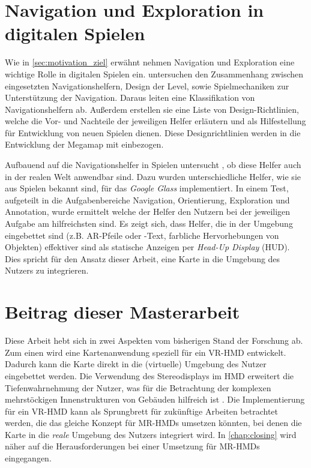 \section{Navigation und Exploration in digitalen Spielen}
Wie in \autoref{sec:motivation_ziel} erwähnt nehmen Navigation und Exploration eine wichtige Rolle in digitalen Spielen ein.
\textcites{Moura2014}{Moura2015} untersuchen den Zusammenhang zwischen eingesetzten Navigationshelfern, Design der Level, sowie Spielmechaniken zur Unterstützung der Navigation.
Daraus leiten \textcite{Moura2015} eine Klassifikation von Navigationshelfern ab.
Außerdem erstellen sie eine Liste von Design-Richtlinien, welche die Vor- und Nachteile der jeweiligen Helfer erläutern und als Hilfestellung für Entwicklung von neuen Spielen dienen.
Diese Designrichtlinien werden in die Entwicklung der Megamap mit einbezogen.

Aufbauend auf die Navigationshelfer in Spielen untersucht \textcite{Lodts2015}, ob diese Helfer auch in der realen Welt anwendbar sind.
Dazu wurden unterschiedliche Helfer, wie sie aus Spielen bekannt sind, für das \emph{Google Glass} implementiert.
In einem Test, aufgeteilt in die Aufgabenbereiche Navigation, Orientierung, Exploration und Annotation, wurde ermittelt welche der Helfer den Nutzern bei der jeweiligen Aufgabe am hilfreichsten sind.
Es zeigt sich, dass Helfer, die in der Umgebung eingebettet sind (z.B. AR-Pfeile oder -Text, farbliche Hervorhebungen von Objekten) effektiver sind als statische Anzeigen per \emph{Head-Up Display} (HUD).
Dies spricht für den Ansatz dieser Arbeit, eine Karte in die Umgebung des Nutzers zu integrieren.

\section{Beitrag dieser Masterarbeit}
Diese Arbeit hebt sich in zwei Aspekten vom bisherigen Stand der Forschung ab.
Zum einen wird eine Kartenanwendung speziell für ein VR-HMD entwickelt.
Dadurch kann die Karte direkt in die (virtuelle) Umgebung des Nutzer eingebettet werden.
Die Verwendung des Stereodisplays im HMD erweitert die Tiefenwahrnehmung der Nutzer, was für die Betrachtung der komplexen mehrstöckigen Innenstrukturen von Gebäuden hilfreich ist \parencite[vgl.][]{Rantakari2017}.
Die Implementierung für ein VR-HMD kann als Sprungbrett für zukünftige Arbeiten betrachtet werden, die das gleiche Konzept für MR-HMDs umsetzen könnten, bei denen die Karte in die \emph{reale} Umgebung des Nutzers integriert wird.
In \autoref{chap:closing} wird näher auf die Herausforderungen bei einer Umsetzung für MR-HMDs eingegangen.

